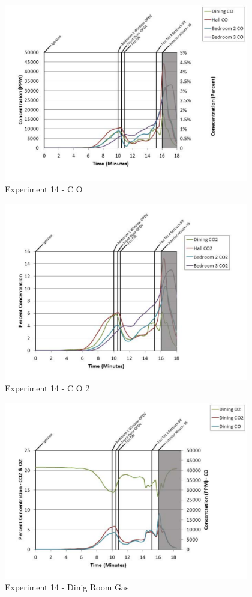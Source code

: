 \documentclass{article}
\begin{document}
\begin{appendices}
	\begin{figure}[h!]
		\centering
		\includegraphics[height=3.05in]{0_Images/Results_Charts/Exp_14_Charts/CO.pdf}
		\caption{Experiment 14 - C O}
	\end{figure}
 
	\clearpage

	\begin{figure}[h!]
		\centering
		\includegraphics[height=3.05in]{0_Images/Results_Charts/Exp_14_Charts/CO2.pdf}
		\caption{Experiment 14 - C O 2}
	\end{figure}
 

	\begin{figure}[h!]
		\centering
		\includegraphics[height=3.05in]{0_Images/Results_Charts/Exp_14_Charts/DinigRoomGas.pdf}
		\caption{Experiment 14 - Dinig Room Gas}
	\end{figure}
 

\end{appendices}
\end{document}
